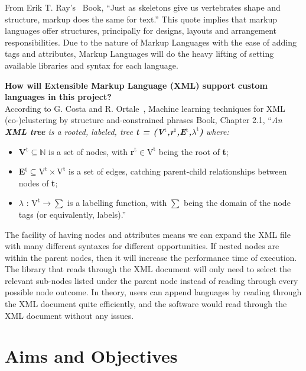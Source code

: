 \documentclass[conference]{IEEEtran}
\begin{document}
          From Erik T. Ray's~\cite{ray_learning_nodate} Book, ``Just as skeletons give us vertebrates shape and structure, markup does the same for text.'' This quote implies that markup languages offer structures, principally for designs, layouts and arrangement responsibilities. Due to the nature of Markup Languages with the ease of adding tags and attributes, Markup Languages will do the heavy lifting of setting available libraries and syntax for each language.

        \textbf{How will Extensible Markup Language (XML) support custom languages in this project?}\\
          According to G. Costa and R. Ortale~\cite{costa_machine_2018}, Machine learning techniques for XML (co-)clustering by structure and-constrained phrases Book, Chapter 2.1, ``\textit{An \textbf{XML tree} is a rooted, labeled, tree \textbf{t = (V$^{\text{t}}$,r$^{\text{t}}$,E$^{\text{t}}$,$\lambda^{\text{t}}$)} where:}
          \begin{itemize}
            \item \textbf{V$^{\text{t}} \subseteq \mathbb{N}$} is a set of nodes, with \textbf{r$^{\text{t}} \in \text{V}^{\text{t}}$} being the root of \textbf{t};
            \item \textbf{E$^{\text{t}} \subseteq \text{V}^{\text{t}} \times \text{V}^{\text{t}}$} is a set of edges, catching parent-child relationships between nodes of \textbf{t};
            \item \textbf{$\lambda \text{ : V}^{\text{t}} \rightarrow \sum $} is a labelling function, with $\sum$ being the domain of the node tags (or equivalently, labels).''
          \end{itemize}

          The facility of having nodes and attributes means we can expand the XML file with many different syntaxes for different opportunities. If nested nodes are within the parent nodes, then it will increase the performance time of execution. The library that reads through the XML document will only need to select the relevant sub-nodes listed under the parent node instead of reading through every possible node outcome. In theory, users can append languages by reading through the XML document quite efficiently, and the software would read through the XML document without any issues.

    \section{Aims and Objectives}
\end{document}
